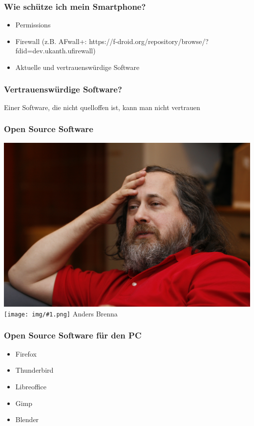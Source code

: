 \documentclass[12pt]{beamer}
\newcommand{\cc}[1]{\texttt{[image: img/\#1.png]}\hspace{1mm}}
\begin{document}
\begin{frame}
    \frametitle{Wie schütze ich mein Smartphone?}
    \begin{itemize}
      \item Permissions
      \item Firewall (z.B. AFwall+: https://f-droid.org/repository/browse/?fdid=dev.ukanth.ufirewall)
      \item Aktuelle und vertrauenswürdige Software
    \end{itemize}
\end{frame}

\begin{frame}
    \frametitle{Vertrauenswürdige Software?}
    \begin{center}\Large
        Einer Software, die nicht quelloffen ist, kann man nicht vertrauen
    \end{center}
\end{frame}

\begin{frame}
    \frametitle{Open Source Software}
    \begin{center}
      \includegraphics[height=0.7\textheight]{img/stallman.jpg}
      \\{\small \cc{by} Anders Brenna}
    \end{center}
\end{frame}

\begin{frame}
    \frametitle{Open Source Software für den PC}
    \begin{itemize}
      \item Firefox
      \item Thunderbird
      \item Libreoffice
      \item Gimp
      \item Blender
    \end{itemize}
\end{frame}
\end{document}
